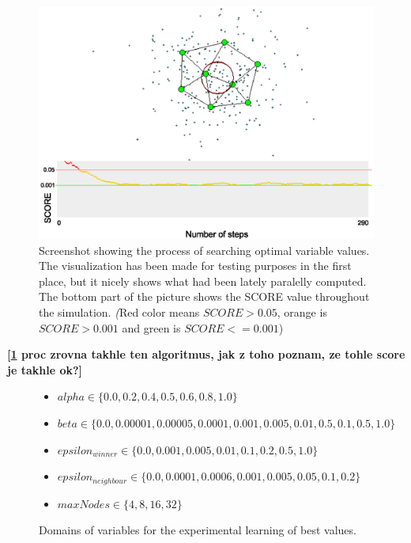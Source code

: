 \begin{figure}      
\begin{center}
\includegraphics[scale=0.75]{images/gng/experimental_setup.eps}    
\caption{Screenshot showing the process of searching optimal variable values. The visualization has been made for testing purposes in the first place, but it nicely shows what had been lately paralelly computed. The bottom part of the picture shows the SCORE value throughout the simulation. {\emph (Red color means $SCORE > 0.05$, orange is $SCORE > 0.001$ and green is $SCORE <= 0.001$)} }
\end{center}                          
\label{usedalgo:gngexperimentscreen}
\end{figure}
\textbf{[\ref{usedalgo:gngexperimentscreen} proc zrovna takhle ten algoritmus, jak z toho poznam, ze tohle score je takhle ok?]}

\begin{figure}          
\begin{itemize}
\item $alpha \in \{0.0, 0.2, 0.4, 0.5, 0.6, 0.8, 1.0\}$
\item $beta \in \{0.0, 0.00001, 0.00005, 0.0001, 0.001, 0.005, 0.01, 0.5, 0.1, 0.5, 1.0\}$
\item $epsilon_{winner} \in \{0.0, 0.001, 0.005, 0.01, 0.1, 0.2, 0.5, 1.0\}$
\item $epsilon_{neighbour} \in \{0.0, 0.0001, 0.0006, 0.001, 0.005, 0.05, 0.1, 0.2\}$
\item $maxNodes \in \{4, 8, 16, 32\}$
\end{itemize}
\caption{Domains of variables for the experimental learning of best values.}
\label{usedalgo:gngexperimentdomains}
\end{figure}

